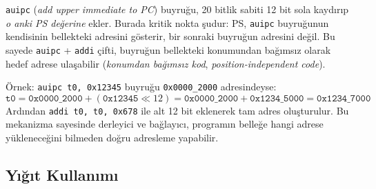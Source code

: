 \begin{bilginot}
\texttt{auipc} (\emph{add upper immediate to PC}) buyruğu, 20 bitlik sabiti 12 bit sola kaydırıp \emph{o anki PS değerine} ekler. Burada kritik nokta şudur: PS, \texttt{auipc} buyruğunun kendisinin bellekteki adresini gösterir, bir sonraki buyruğun adresini değil. Bu sayede \texttt{auipc} + \texttt{addi} çifti, buyruğun bellekteki konumundan bağımsız olarak hedef adrese ulaşabilir (\emph{konumdan bağımsız kod}, \emph{position-independent code}).

Örnek: \texttt{auipc t0, 0x12345} buyruğu \texttt{0x0000\_2000} adresindeyse:
\[
\texttt{t0} = \texttt{0x0000\_2000} + (\texttt{0x12345} \ll 12) = \texttt{0x0000\_2000} + \texttt{0x1234\_5000} = \texttt{0x1234\_7000}
\]
Ardından \texttt{addi t0, t0, 0x678} ile alt 12 bit eklenerek tam adres oluşturulur. Bu mekanizma sayesinde derleyici ve bağlayıcı, programın belleğe hangi adrese yükleneceğini bilmeden doğru adresleme yapabilir.
\end{bilginot}

\subsection{Yığıt Kullanımı}
\label{subsec:yigit-kullanimi}


